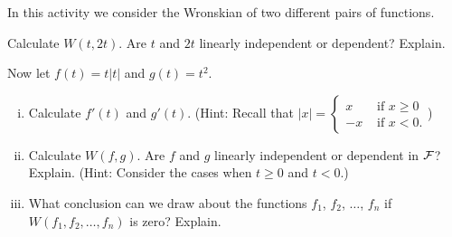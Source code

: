 \begin{pactivity} In this activity we consider the Wronskian of two different pairs of functions.
	\ba
	\item Calculate $W\left(t, 2t\right)$. Are $t$ and $2t$ linearly independent or dependent? Explain.
	

	\item Now let $f(t) = t|t|$ and $g(t) = t^2$.
		\begin{enumerate}[i.]
		\item Calculate $f'(t)$ and $g'(t)$.  (Hint: Recall that $|x| = \begin{cases} x &\text{ if } x \geq 0 \\ -x & \text{ if } x < 0. \end{cases}$)
	

		\item Calculate $W\left(f, g \right)$. Are $f$ and $g$ linearly independent or dependent in $\mathcal{F}$? Explain. (Hint: Consider the cases when $t \geq 0$ and $t < 0$.)
		

		\item What conclusion can we draw about the functions $f_1$, $f_2$, $\ldots$, $f_n$ if $W(f_1,f_2, \ldots, f_n)$ is zero? Explain. 
		
	
		\end{enumerate}
		
	\ea
	
\end{pactivity}
		

